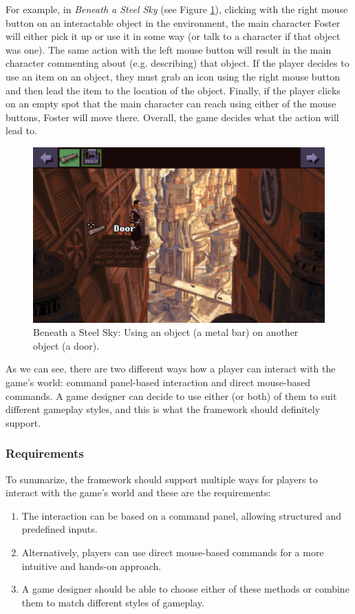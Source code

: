 For example, in \textit{Beneath a Steel Sky} (see Figure \ref{fig:C-BaSS}), clicking with the right mouse button on an interactable object in the environment, the main character Foster will either pick it up or use it in some way (or talk to a character if that object was one). The same action with the left mouse button will result in the main character commenting about (e.g. describing) that object. If the player decides to use an item on an object, they must grab an icon using the right mouse button and then lead the item to the location of the object. Finally, if the player clicks on an empty spot that the main character can reach using either of the mouse buttons, Foster will move there. Overall, the game decides what the action will lead to.

\begin{figure}[H]
\centering
\includegraphics[width=.8\linewidth]{img/C-BaSS.png}
\caption{Beneath a Steel Sky: Using an object (a metal bar) on another object (a door).}
\label{fig:C-BaSS}
\end{figure}

As we can see, there are two different ways how a player can interact with the game's world: command panel-based interaction and direct mouse-based commands. A game designer can decide to use either (or both) of them to suit different gameplay styles, and this is what the framework should definitely support.

\subsubsection{Requirements}
To summarize, the framework should support multiple ways for players to interact with the game's world and these are the requirements:

\begin{enumerate}[label=\color{teal}\textbf{R{\arabic*}}]
  \item \label{intro:req:com_pan} The interaction can be based on a command panel, allowing structured and predefined inputs.
  \item \label{intro:req:mouse} Alternatively, players can use direct mouse-based commands for a more intuitive and hands-on approach.
  \item \label{intro:req:mix} A game designer should be able to choose either of these methods or combine them to match different styles of gameplay.
  \end{enumerate}

